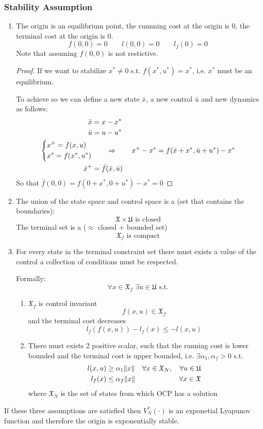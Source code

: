 \subsubsection{Stability Assumption}
\begin{enumerate}[label={\textbf{Ass. \#\arabic*}:}, leftmargin = 3cm]
\item The origin is an equilibrium point, the runnning cost at the origin is 0, the terminal cost at the origin is 0.
\[f(0,0)= 0\qquad l(0,0) = 0\qquad l_f(0) = 0\]
Note that assuming $f(0,0)$ is not restictive.
\begin{proof}
If we want to stabilize $x^* \ne 0$ s.t. $f(x^*, u^*) = x^*$, i.e. $x^*$ must be an equilibrium.

To achieve so we can define a new state $\bar{x}$, a new control $\bar{u}$ and new dynamics as follows:
\begin{align*}
\bar{x} &= x - x^*\\
\bar{u} &= u - u^*\\
\begin{dcases}
x^+ = f(x,u)\\
x^* = f(x^*, u^*)
\end{dcases}
&\qquad\Rightarrow\qquad
x^+ - x^* = f(\bar{x}+x^*, \bar{u} + u^*) - x^*\\
\bar{x}^+ &= \bar{f}(\bar{x}, \bar{u})
\end{align*}
So that $\bar{f}(0,0) = f(0+x^*, 0+u^*) - x^* = 0$
\end{proof}
\item The union of the state space and control space is a  (set that contains the boundaries):
\[\mathfrak{X} \times \mathfrak{U} \text{ is closed}\]
The terminal set is a  ($\approx$ closed + bounded set)
\[\mathfrak{X}_f \text{ is compact}\]

\item  For every state in the terminal constraint set there must exists a value of the control a collection of conditions must be respected.

Formally:
\[\forall x \in \mathfrak{X}_f\,\,\exists u \in \mathfrak{U} \text{ s.t.}\]
\begin{enumerate}
\item $\mathfrak{X}_f$ is control invariant
\[f(x,u)\in \mathfrak{X}_f\]
and the terminal cost decreases
\[l_f(f(x,u)) - l_f(x) \le - l(x,u)\]
\item There must exists 2 positive scalar, such that the running cost is lower bounded and the terminal cost is upper bounded, i.e.
$\exists \alpha_1, \alpha_f > 0$ s.t.
\begin{align*}
l(x,u)&\ge \alpha_1 \lVert x\rVert & \forall x\in \mathfrak{X}_N, \quad \forall u\in\mathfrak{U}\\
l_f(x)&\le \alpha_f \lVert x\rVert & \forall x \in \mathfrak{X}
\end{align*}
where $\mathfrak{X}_N$ is the set of states from which OCP has a solution
\end{enumerate}
\end{enumerate}
If these three assumptions are satisfied then $V_N^*(\cdot)$ is an exponetial Lyapunov function and therefore the origin is exponentially stable.


